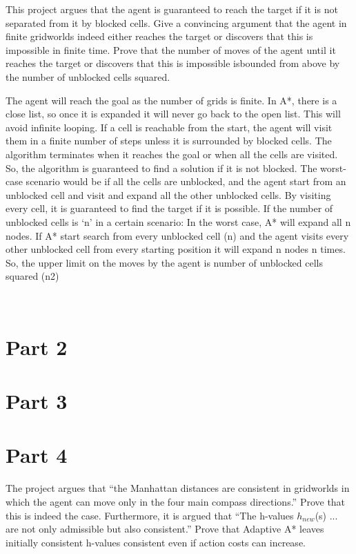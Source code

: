 \documentclass[12pt]{article}
\begin{document}
\begin{enumerate}[label=\alph*]
\begin{flushleft}
\begin{itshape}
  		This project argues that the agent is guaranteed to reach the target if it is not separated 
from it by blocked cells. Give a convincing argument that the agent in finite gridworlds indeed either reaches the target or discovers that this is impossible
in finite time. Prove that the number of moves of the agent until it reaches the target
or discovers that this is impossible isbounded from above by the number of
unblocked cells squared.
        \end{itshape}
       \vskip 0.5cm 
The agent will reach the goal as the number of grids is finite. 
In A*, there is a close list, so once it is expanded it will never go back to the open list. This will avoid infinite looping.
If a cell is reachable from the start, the agent will visit them in a finite number of steps unless it is surrounded by blocked cells. 
\vskip 0.5cm
The algorithm terminates when it reaches the goal or when all the cells are visited. So, the
algorithm is guaranteed to find a solution if it is not blocked.
The worst-case scenario would be if all the cells are unblocked, and the agent start from an unblocked cell and visit and expand all the other unblocked cells. By visiting every cell, it is guaranteed to find the target if it is possible.
\vskip 0.5cm
If the number of unblocked cells is ‘n’ in a certain scenario:
In the worst case, A* will expand all n nodes.  
If A* start search from every unblocked cell (n) and the agent visits every other unblocked cell from every starting position it will expand n nodes n times.
\vskip 0.5cm
So, the upper limit on the moves by the agent is number of unblocked cells squared (n2)
	\end{flushleft}
 \end{enumerate}

\section*{Part 2}

\section*{Part 3}

\section*{Part 4}

        \begin{itshape}
       The project argues that “the Manhattan distances are consistent in gridworlds in which the agent can move only in the four main compass directions.” Prove that this is indeed the case.
\vskip 0.5cm
Furthermore, it is argued that “The h-values 
$h_{new}$(s) ... are not only admissible but also consistent.” Prove that Adaptive A* leaves initially consistent h-values consistent even if action costs can increase.
         \end{itshape}
         
\end{document}
